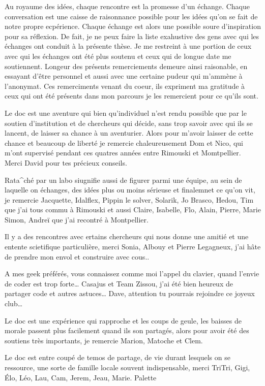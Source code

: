 Au royaume des idées, chaque rencontre est la promesse d'un échange.
Chaque conversation est une caisse de raisonnance possible pour les
idées qu'on se fait de notre propre ecpérience. Chaque échange est alors
une possible soure d'inspiration pour sa réflexion. De fait, je ne peux
faire la liste exahustive des gens avec qui les échanges ont conduit à
la présente thèse. Je me restreint à une portion de ceux avec qui les
échanges ont été plus soutenu et ceux qui de longue date me soutiennent.
Longeur des présents remerciements demeure ainsi raisonable, en essayant
d'être personnel et aussi avec une certaine pudeur qui m'ammène à
l'anonymat. Ces remerciments venant du coeur, ils expriment ma gratitude
à ceux qui ont été présents dans mon parcours je les remercient pour ce
qu'ils sont.

Le doc est une aventure qui bien qu'individuel n'est rendu possible que
par le soutien d'institution et de chercheurs qui décide, sans trop
savoir avec qui ils se lancent, de laisser sa chance à un aventurier.
Alors pour m'avoir laisser de cette chance et beaucoup de liberté je
remercie chaleureusement Dom et Nico, qui m'ont supervisé pendant ces
quatres années entre Rimouski et Momtpellier. Merci David pour tes
précieux conseils.

Rata\^{}ché par un labo siugnifie aussi de figurer parmi une équipe, au
sein de laquelle on échanges, des idées plus ou moins sérieuse et
finalemnet ce qu'on vit, je remercie Jacquette, Idalflex, Pippin le
solver, Solarik, Jo Brasco, Hedou, Tim que j'ai tous commu à Rimouski et
aussi Claire, Isabelle, Flo, Alain, Pierre, Marie Simon, Andreï que j'ai
recontré à Montpellier.

Il y a des rencontres avec ertains chercheurs qui nous donne une amitié
et une entente scietifique particulière, merci Sonia, Albouy et Pierre
Legagneux, j'ai hâte de prendre mon envol et construire avec cous..

A mes geek préférés, vous connaissez comme moi l'appel du clavier, quand
l'envie de coder est trop forte\ldots{} Casajus et Team Zissou, j'ai été
bien heureux de partager code et autres astuces\ldots{} Dave, attention
tu pourrais rejoindre ce joyeux club\ldots{}

Le doc est une expérience qui rapproche et les coups de geule, les
baisses de morale passent plus facilement quand ils son partagés, alors
pour avoir été des soutiens très importants, je remercie Marion, Matoche
et Clem.

Le doc est entre coupé de temos de partage, de vie durant lesquels on se
ressource, une sorte de famille locale souvent indispensable, merci
TriTri, Gigi, Élo, Léo, Lau, Cam, Jerem, Jeau, Marie. Palette

